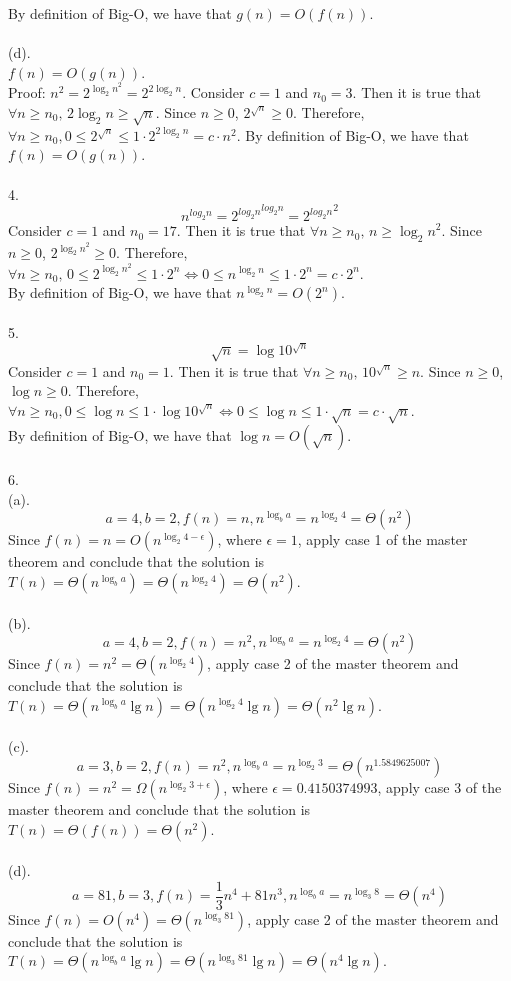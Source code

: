 \documentclass{article}
\begin{document}
By definition of Big-O, we have that $g(n)=O(f(n))$.
\\
\\
(d).
\\
$f(n)=O(g(n))$.
\\
Proof: $n^2=2^{{\log_{2} n}^2}=2^{2\log_{2} n}$. Consider $c=1$ and $n_{0}=3$. Then it is true that $\forall n\geq n_{0},\, 2\log_{2} n\geq \sqrt n$. Since $n\geq 0$, $2^{\sqrt n}\geq 0$. Therefore, $\forall n\geq n_{0}, 0\leq 2^{\sqrt n}\leq 1\cdot 2^{2\log_{2} n}=c\cdot n^2$.
By definition of Big-O, we have that $f(n)=O(g(n))$.
\\
\\
4.
\\
$$n^{log_{2} n}={2^{log_{2} n}}^{log_{2} n}={2^{log_{2} n}}^2$$
Consider $c=1$ and $n_{0}=17$. Then it is true that $\forall n\geq n_{0},\, n\geq {\log_{2} n}^2$. Since $n\geq 0$, $2^{{\log_{2} n}^2}\geq 0$. Therefore, $\forall n\geq n_{0},\, 0\leq 2^{{\log_{2} n}^2} \leq 1\cdot 2^n \iff 0\leq n^{\log_{2} n} \leq 1\cdot 2^n = c\cdot 2^n$.
\\
By definition of Big-O, we have that $n^{\log_{2} n}=O(2^n)$.
\\
\\
5.
\\
$$\sqrt n=\log 10^{\sqrt n}$$
Consider $c=1$ and $n_{0}=1$. Then it is true that $\forall n\geq n_{0},\, 10^{\sqrt n}\geq n$. Since $n\geq 0$, $\log n\geq 0$. Therefore, $\forall n\geq n_{0}, 0\leq \log n\leq 1\cdot \log 10^{\sqrt n}\iff 0\leq \log n\leq 1\cdot \sqrt n = c\cdot \sqrt n$.
\\
By definition of Big-O, we have that $\log n=O(\sqrt n)$.
\\
\\
6.
\\
(a).
\\
$$a=4,b=2,f(n)=n,n^{\log_{b} a}=n^{\log_{2} 4}=\Theta(n^2)$$
Since $f(n)=n=O(n^{\log_{2} 4-\epsilon})$, where $\epsilon=1$, apply case 1 of the master theorem and conclude that the solution is $T(n)=\Theta(n^{\log_{b} a})=\Theta(n^{\log_{2} 4})=\Theta(n^2)$.
\\
\\
(b).
$$a=4,b=2,f(n)=n^2,n^{\log_{b} a}=n^{\log_{2} 4}=\Theta(n^2)$$
Since $f(n)=n^2=\Theta(n^{\log_{2} 4})$, apply case 2 of the master theorem and conclude that the solution is $T(n)=\Theta(n^{\log_{b} a}\lg n)=\Theta(n^{\log_{2} 4}\lg n)=\Theta(n^2\lg n)$.
\\
\\
(c).
$$a=3,b=2,f(n)=n^2,n^{\log_{b} a}=n^{\log_{2} 3}=\Theta(n^{1.5849625007})$$
Since $f(n)=n^2=\Omega(n^{\log_{2} 3+\epsilon})$, where $\epsilon=0.4150374993$, apply case 3 of the master theorem and conclude that the solution is $T(n)=\Theta(f(n))=\Theta(n^2)$.
\\
\\
(d).
$$a=81,b=3,f(n)=\dfrac{1}{3}n^4+81n^3,n^{\log_{b} a}=n^{\log_{3} 8}=\Theta(n^4)$$
Since $f(n)=O(n^4)=\Theta(n^{\log_{3} 81})$, apply case 2 of the master theorem and conclude that the solution is $T(n)=\Theta(n^{\log_{b} a}\lg n)=\Theta(n^{\log_{3} 81}\lg n)=\Theta(n^4\lg n)$.
\end{document}
